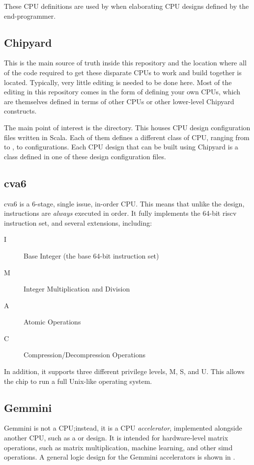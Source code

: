 These CPU definitions are used by  when elaborating CPU designs defined by the end-programmer.

\subsection{Chipyard}\label{sec:Chipyard_Generator}
This is the main source of truth inside this repository and the location where all of the code required to get these disparate CPUs to work and build together is located.
Typically, very little editing is needed to be done here.
Most of the editing in this repository comes in the form of defining your own CPUs, which are themselves defined in terms of other CPUs or other lower-level Chipyard constructs.

The main point of interest is the  directory.
This houses CPU design configuration files written in Scala.
Each of them defines a different class of CPU, ranging from  to , to  configurations.
Each CPU design that can be built using Chipyard is a class defined in one of these design configuration files.

\subsection{cva6}\label{sec:cva6_Generator}
\nocite{cva6Github}
\nocite{zaruba2019cost}
cva6 is a 6-stage, single issue, in-order CPU.\@
This means that unlike the  design, instructions are \emph{always} executed in order.
It fully implements the 64-bit \Gls{riscv} instruction set, and several extensions, including:
\begin{description}
\item[I] Base Integer (the base 64-bit instruction set)
\item[M] Integer Multiplication and Division
\item[A] Atomic Operations
\item[C] Compression/Decompression Operations
\end{description}
In addition, it supports three different privilege levels, M, S, and U.
This allows the chip to run a full Unix-like operating system.

\subsection{Gemmini}\label{sec:Gemmini_Generator}
\nocite{gemminiGithub}
\nocite{gemminiPaper}
Gemmini is not a CPU;\@ instead, it is a CPU \emph{\gls{accelerator}}, implemented alongside another CPU, such as a  or  design.
It is intended for hardware-level matrix operations, such as matrix multiplication, machine learning, and other \gls{simd} operations.
A general logic design for the Gemmini \glspl{accelerator} is shown in .


